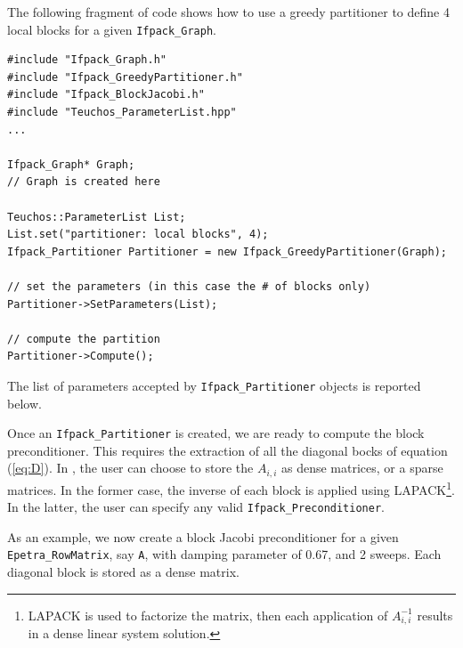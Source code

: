 The following fragment of code shows how to use a greedy partitioner to define
4 local blocks for a given \verb!Ifpack_Graph!.

\begin{verbatim}
#include "Ifpack_Graph.h"
#include "Ifpack_GreedyPartitioner.h"
#include "Ifpack_BlockJacobi.h"
#include "Teuchos_ParameterList.hpp"
...

Ifpack_Graph* Graph;   
// Graph is created here

Teuchos::ParameterList List;
List.set("partitioner: local blocks", 4);
Ifpack_Partitioner Partitioner = new Ifpack_GreedyPartitioner(Graph);

// set the parameters (in this case the # of blocks only)
Partitioner->SetParameters(List);

// compute the partition
Partitioner->Compute();
\end{verbatim}

The list of parameters accepted by \verb!Ifpack_Partitioner! objects is
reported below.

\medskip


\medskip

Once an \verb!Ifpack_Partitioner! is created, we are ready to
compute the block preconditioner. This requires the extraction of
all the diagonal bocks of equation (\ref{eq:D}). In \ifpack, the
user can choose to store the $A_{i,i}$ as dense matrices, or a sparse
matrices. In the former case, the inverse of each block is applied using
LAPACK\footnote{LAPACK is used to factorize the matrix, then each application
  of $A_{i,i}^{-1}$ results in a dense linear system solution.}. In the
  latter, the user can specify any valid \verb!Ifpack_Preconditioner!.

As an example, we now create a block Jacobi preconditioner for 
a given \verb!Epetra_RowMatrix!, say \verb!A!,
with damping parameter of 0.67, and 2 sweeps. Each diagonal block is stored as a dense
matrix.

